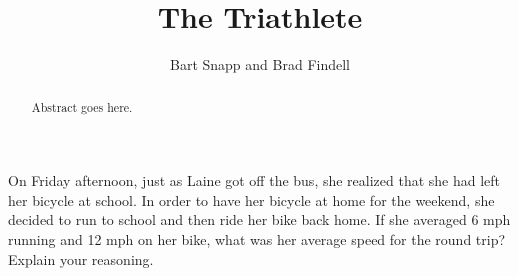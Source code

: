 \documentclass{ximera}
\title{The Triathlete}
\author{Bart Snapp and Brad Findell}
\begin{document}
\begin{abstract}
Abstract goes here.  
\end{abstract}
\maketitle

\label{A:Triathlete}

\begin{problem} 
On Friday afternoon, just as Laine got off the bus, she realized that she had left her bicycle at school.  In order to have her bicycle at home for the weekend, she decided to run to school and then ride her bike back home.  If she averaged 6 mph running and 12 mph on her bike, what was her average speed for the round trip?  Explain your reasoning. 
\end{problem}
\end{document}
